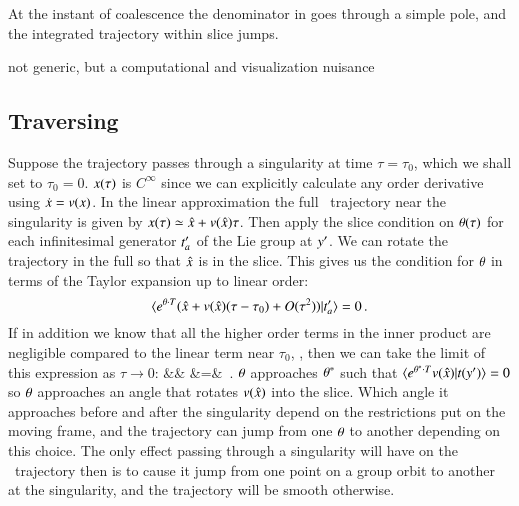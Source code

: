 At the instant of
coalescence the denominator in  goes through a simple
pole, and the integrated trajectory within slice jumps.


not generic, but a computational and visualization nuisance

\subsection{Traversing {\sset}}
\label{sec:sliceSing}


Suppose the trajectory passes through a singularity at time
$\tau=\tau_0$, which we shall set to  $\tau_0=0$. $x(\tau)$ is
$C^{\infty}$ since we can explicitly calculate any order derivative using
$\dot{x}=v(x)$. In the linear approximation the full \statesp\
trajectory near the singularity is given by
$x(\tau)\simeq\hat{x}+v(\hat{x}) \tau$. Then apply the slice
condition \refeq{PCsectQ1} on ${\bf \theta}(\tau)$ for each infinitesimal
generator $t'_{a}$ of the Lie group at ${y'}$.
We can rotate the trajectory in the full {\statesp} so that $\hat{x}$
is in the slice. This gives us the condition for ${\bf \theta}$
 in terms of the Taylor expansion
up to linear order:
\[
\braket{e^{\gSpace \cdot \Lg}(\hat{\ssp}+\vel(\hat{\ssp}) (\tau-\tau_0)+O(\tau^2))}
       {\sliceTan{a}} = 0
\,.
\]
If in addition we know that all the higher order terms in
the inner product are negligible compared to the linear term near $\tau_0$,
\beq
{}
\ll {},
\ee{eq:neglig}
then we can take the limit of this expression as $\tau \rightarrow 0$:
\bea
{}
    \continue
&\simeq& 
    \continue
&=&  \tau{}
\,.
\eea
${\bf \theta}$ approaches ${\bf \theta}^*$ such that $\braket{e^{\gSpace^* \cdot
\Lg}\vel(\hat{\ssp})}{\groupTan(\slicep)}= 0$ so ${\bf \theta}$ approaches an
angle that rotates $v(\hat{x})$ into the slice. Which angle it
approaches before and after the singularity depend on the restrictions
put on the moving frame, and the trajectory can
jump from one ${\bf \theta}$ to another depending on this choice. The only
effect passing through a singularity will have on the \reducedsp\
trajectory then is to cause it jump from one point on a group orbit to
another at the singularity, and the trajectory will be smooth otherwise.


